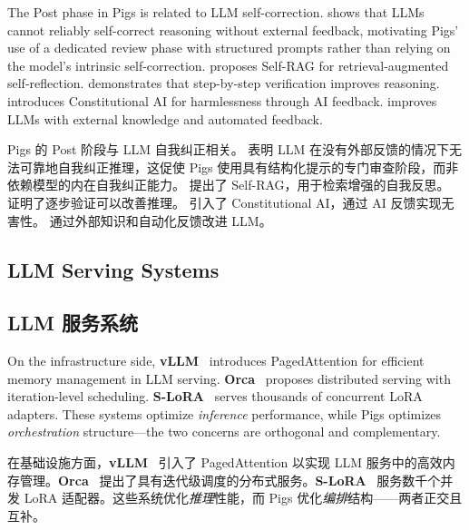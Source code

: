 The Post phase in Pigs is related to LLM self-correction. \citet{huang2024selfcorrect} shows that LLMs cannot reliably self-correct reasoning without external feedback, motivating Pigs' use of a dedicated review phase with structured prompts rather than relying on the model's intrinsic self-correction. \citet{asai2023selfrag} proposes Self-RAG for retrieval-augmented self-reflection. \citet{lightman2023verify} demonstrates that step-by-step verification improves reasoning. \citet{bai2022constitutional} introduces Constitutional AI for harmlessness through AI feedback. \citet{peng2023checkfacts} improves LLMs with external knowledge and automated feedback.
\begin{chinese}
Pigs 的 Post 阶段与 LLM 自我纠正相关。\citet{huang2024selfcorrect} 表明 LLM 在没有外部反馈的情况下无法可靠地自我纠正推理，这促使 Pigs 使用具有结构化提示的专门审查阶段，而非依赖模型的内在自我纠正能力。\citet{asai2023selfrag} 提出了 Self-RAG，用于检索增强的自我反思。\citet{lightman2023verify} 证明了逐步验证可以改善推理。\citet{bai2022constitutional} 引入了 Constitutional AI，通过 AI 反馈实现无害性。\citet{peng2023checkfacts} 通过外部知识和自动化反馈改进 LLM。
\end{chinese}

\subsection{LLM Serving Systems}
\begin{chinese}
\subsection{LLM 服务系统}
\end{chinese}

On the infrastructure side, \textbf{vLLM}~\citep{kwon2023vllm} introduces PagedAttention for efficient memory management in LLM serving. \textbf{Orca}~\citep{yu2022orca} proposes distributed serving with iteration-level scheduling. \textbf{S-LoRA}~\citep{sheng2023slora} serves thousands of concurrent LoRA adapters. These systems optimize \emph{inference} performance, while Pigs optimizes \emph{orchestration} structure---the two concerns are orthogonal and complementary.
\begin{chinese}
在基础设施方面，\textbf{vLLM}~\citep{kwon2023vllm} 引入了 PagedAttention 以实现 LLM 服务中的高效内存管理。\textbf{Orca}~\citep{yu2022orca} 提出了具有迭代级调度的分布式服务。\textbf{S-LoRA}~\citep{sheng2023slora} 服务数千个并发 LoRA 适配器。这些系统优化\emph{推理}性能，而 Pigs 优化\emph{编排}结构——两者正交且互补。
\end{chinese}

